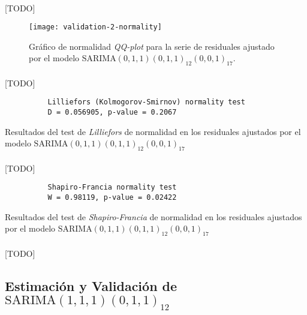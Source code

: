 \documentclass[a4paper, spanish]{article}
\begin{document}
      \paragraph{}
      [TODO]

      \begin{figure}[htb!]
        \centering
        \texttt{[image: validation-2-normality]}
        \caption{Gráfico de normalidad \emph{QQ-plot} para la serie de residuales ajustado por el modelo $\text{SARIMA}(0, 1, 1)(0, 1, 1)_{12}(0, 0, 1)_{17}$.}
        \label{img:validation_2_normality}
      \end{figure}

      \paragraph{}
      [TODO]

      \begin{table}
        \begin{Verbatim}
          Lilliefors (Kolmogorov-Smirnov) normality test
          D = 0.056905, p-value = 0.2067
        \end{Verbatim}
        \caption{Resultados del test de \emph{Lilliefors} de normalidad en los residuales ajustados por el modelo $\text{SARIMA}(0, 1, 1)(0, 1, 1)_{12}(0, 0, 1)_{17}$}
        \label{result:comparison_2_lilliefors}
      \end{table}

      \paragraph{}
      [TODO]

      \begin{table}
        \begin{Verbatim}
          Shapiro-Francia normality test
          W = 0.98119, p-value = 0.02422
        \end{Verbatim}
        \caption{Resultados del test de \emph{Shapiro-Francia} de normalidad en los residuales ajustados por el modelo $\text{SARIMA}(0, 1, 1)(0, 1, 1)_{12}(0, 0, 1)_{17}$}
        \label{result:comparison_2_sf}
      \end{table}

      \paragraph{}
      [TODO]

    \subsection{Estimación y Validación de \textbf{$\text{SARIMA}(1, 1, 1)(0, 1, 1)_{12}$}}
    \label{sec:fitting_3}
\end{document}
